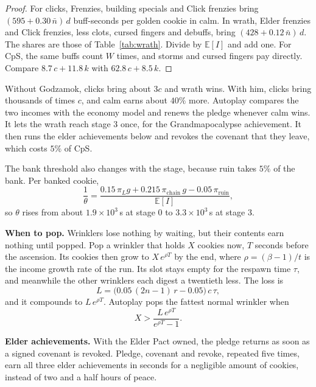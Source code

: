 \documentclass[11pt,a4paper]{article}
\numberwithin{equation}{section}
\theoremstyle{definition}
\theoremstyle{remark}
\newcommand{\E}{\mathbb E}
\newcommand{\proofstep}[1]{\par\addvspace{\medskipamount}\noindent\textbf{#1}\enspace\ignorespaces}
\begin{document}
\begin{proof}
For clicks, Frenzies, building specials and Click frenzies bring $(595+0.30\,\bar n)\,d$ buff-seconds per golden cookie in calm. In wrath, Elder frenzies and Click frenzies, less clots, cursed fingers and debuffs, bring $(428+0.12\,\bar n)\,d$. The shares are those of Table~\ref{tab:wrath}. Divide by $\E[I]$ and add one. For CpS, the same buffs count $W$ times, and storms and cursed fingers pay directly. Compare $8.7\,c+11.8\,k$ with $62.8\,c+8.5\,k$.
\end{proof}

Without Godzamok, clicks bring about $3c$ and wrath wins. With him, clicks bring thousands of times $c$, and calm earns about $40\%$ more. Autoplay compares the two incomes with the economy model and renews the pledge whenever calm wins. It lets the wrath reach stage 3 once, for the Grandmapocalypse achievement. It then runs the elder achievements below and revokes the covenant that they leave, which costs $5\%$ of CpS.

The bank threshold also changes with the stage, because ruin takes $5\%$ of the bank. Per banked cookie,
\begin{equation}\label{eq:theta-stage}
 \frac1\theta=\frac{0.15\,\pi_Lg+0.215\,\pi_{\mathrm{chain}}\,g-0.05\,\pi_{\mathrm{ruin}}}{\E[I]},
\end{equation}
so $\theta$ rises from about $1.9\times10^3$\,s at stage 0 to $3.3\times10^3$\,s at stage 3.

\proofstep{When to pop.} Wrinklers lose nothing by waiting, but their contents earn nothing until popped. Pop a wrinkler that holds $X$ cookies now, $T$ seconds before the ascension. Its cookies then grow to $X\,e^{\rho T}$ by the end, where $\rho=(\beta-1)/t$ is the income growth rate of the run. Its slot stays empty for the respawn time $\tau$, and meanwhile the other wrinklers each digest a twentieth less. The loss is
\begin{equation}\label{eq:pop-loss}
 L=\bigl(0.05\,(2n-1)\,r-0.05\bigr)\,c\,\tau,
\end{equation}
and it compounds to $L\,e^{\rho T}$. Autoplay pops the fattest normal wrinkler when
\begin{equation}\label{eq:pop}
 X>\frac{L\,e^{\rho T}}{e^{\rho T}-1}.
\end{equation}

\proofstep{Elder achievements.} With the Elder Pact owned, the pledge returns as soon as a signed covenant is revoked. Pledge, covenant and revoke, repeated five times, earn all three elder achievements in seconds for a negligible amount of cookies, instead of two and a half hours of peace.
\end{document}
